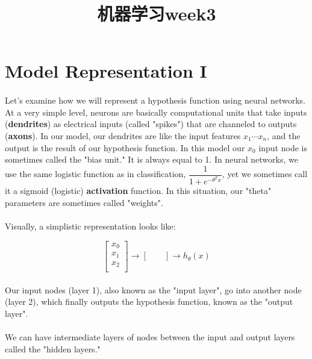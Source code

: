 \documentclass[UTF8]{ctexart}
\title{机器学习week3}
\author{  }
\date{}
\begin{document}
\maketitle
\tableofcontents

\newpage
\section{Model Representation I}
\paragraph{}
Let's examine how we will represent a hypothesis function using neural networks. At a very simple level, neurons are basically computational units that take inputs (\textbf{dendrites}) as electrical inputs (called "spikes") that are channeled to outputs (\textbf{axons}). In our model, our dendrites are like the input features $x_{1} \cdots x_{n}$, and the output is the result of our hypothesis function. In this model our $ x_{0} $ input node is sometimes called the "bias unit." It is always equal to 1. In neural networks, we use the same logistic function as in classification, $ \dfrac{1}{1+e^{-\theta^{T}x}} $, yet we sometimes call it a sigmoid (logistic) \textbf{activation} function. In this situation, our "theta" parameters are sometimes called "weights".
\paragraph{}
Visually, a simplistic representation looks like:
\begin{algorithm}
\begin{equation}
\left[\begin{array}{c}
x_{0}\\
x_{1}\\
x_{2}\\
\end{array}\right] \rightarrow  [\qquad]
\rightarrow h_{\theta}(x)
\end{equation}
\end{algorithm}
\paragraph{}
Our input nodes (layer 1), also known as the "input layer", go into another node (layer 2), which finally outputs the hypothesis function, known as the "output layer".
\paragraph{}
We can have intermediate layers of nodes between the input and output layers called the "hidden layers."
\end{document}

